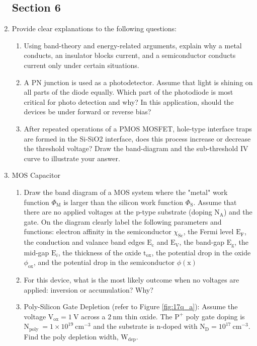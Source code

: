\documentclass[main.tex]{subfiles}
\begin{document}
\begin{enumerate}

\subsection{Section 6}

\item Provide clear explanations to the following questions:

    \begin{enumerate}
        \item Using band-theory and energy-related arguments, explain why a metal conducts, an insulator blocks current, and a semiconductor conducts current only under certain situations.
        \item A PN junction is used as a photodetector. Assume that light is shining on all parts of the diode equally. Which part of the photodiode is most critical for photo detection and why? In this application, should the devices be under forward or reverse bias?
        \item After repeated operations of a PMOS MOSFET, hole-type interface traps are formed in the Si-SiO2 interface, does this process increase or decrease the threshold voltage? Draw the band-diagram and the sub-threshold IV curve to illustrate your answer.
    \end{enumerate}

\item MOS Capacitor

    \begin{enumerate}
        \item Draw the band diagram of a MOS system where the "metal" work function $\Phi_{\mathrm{M}}$ is larger than the silicon work function $\Phi_{\mathrm{S}}$. Assume that there are no applied voltages at the p-type substrate (doping $\mathrm{N}_{\mathrm{A}}$) and the gate. On the diagram clearly label the following parameters and functions: electron affinity in the semiconductor $\chi_{\mathrm{Sc}}$, the Fermi level $\mathrm{E}_{\mathrm{F}}$, the conduction and valance band edges $\mathrm{E}_{\mathrm{c}}$ and $\mathrm{E}_{\mathrm{V}}$, the band-gap $\mathrm{E}_{\mathrm{g}}$, the mid-gap $\mathrm{E}_{i}$, the thickness of the oxide $\mathrm{t}_{\mathrm{ox}}$, the potential drop in the oxide $\phi_{\mathrm{ox}}$, and the potential drop in the semiconductor $\phi(\mathrm{x})$
        \item For this device, what is the most likely outcome when no voltages are applied: inversion or accumulation? Why?
        \item Poly-Silicon Gate Depletion (refer to Figure \ref{fig:17q_a}): Assume the voltage $\mathrm{V}_{\mathrm{ox}} = \qty{1}{\volt}$ across a $\qty{2}{\nano\meter}$ thin  oxide. The $\mathrm{P}^{+}$ poly gate doping is $\mathrm{N}_{\text {poly }}=1 \times 10^{19} \mathrm{~cm}^{-3}$ and the substrate is n-doped with $\mathrm{N}_{\mathrm{D}}=10^{17} \mathrm{~cm}^{-3}$. Find the poly depletion width, $\mathrm{W}_{\mathrm{dep }}$.
    \end{enumerate}
    

\end{enumerate}
\end{document}
